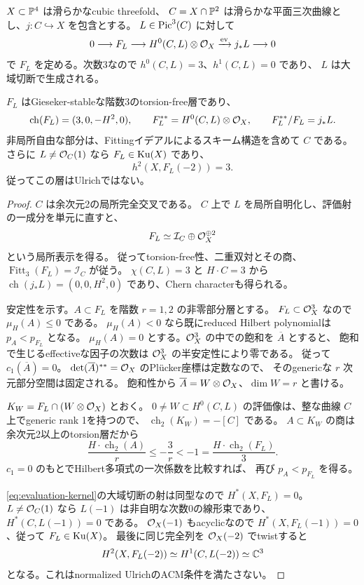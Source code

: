 $X\subset\mathbb P^4$ は滑らかなcubic threefold、
$C=X\cap\mathbb P^2$ は滑らかな平面三次曲線とし、$j:C\hookrightarrow X$ を包含とする。
$L\in\operatorname{Pic}^3(C)$ に対して
\begin{equation}\label{eq:evaluation-kernel}
 0\longrightarrow F_L\longrightarrow H^0(C,L)\otimes\mathcal O_X
 \xrightarrow{\mathrm{ev}}j_*L\longrightarrow0
\end{equation}
で $F_L$ を定める。次数3なので $h^0(C,L)=3$、$h^1(C,L)=0$ であり、
$L$ は大域切断で生成される。

\begin{theorem}[評価核の安定性と特異部分]\label{thm:evaluation-sheaf}
$F_L$ はGieseker-stableな階数3のtorsion-free層であり、
\[
 \operatorname{ch}(F_L)=(3,0,-H^2,0),\qquad
 F_L^{**}=H^0(C,L)\otimes\mathcal O_X,\qquad F_L^{**}/F_L=j_*L.
\]
非局所自由な部分は、Fittingイデアルによるスキーム構造を含めて $C$ である。
さらに $L\ne\mathcal O_C(1)$ なら $F_L\in\operatorname{Ku}(X)$ であり、
\[
 h^2(X,F_L(-2))=3.
\]
従ってこの層はUlrichではない。
\end{theorem}

\begin{proof}
$C$ は余次元2の局所完全交叉である。
$C$ 上で $L$ を局所自明化し、評価射の一成分を単元に直すと、
\[
 F_L\simeq\mathcal I_C\oplus\mathcal O_X^{\oplus2}
\]
という局所表示を得る。
従ってtorsion-free性、二重双対とその商、
$\operatorname{Fitt}_3(F_L)=\mathcal I_C$ が従う。
$\chi(C,L)=3$ と $H\cdot C=3$ から
$\operatorname{ch}(j_*L)=(0,0,H^2,0)$ であり、Chern characterも得られる。

安定性を示す。$A\subset F_L$ を階数 $r=1,2$ の非零部分層とする。
$F_L\subset\mathcal O_X^3$ なので $\mu_H(A)\le0$ である。
$\mu_H(A)<0$ なら既にreduced Hilbert polynomialは $p_A<p_{F_L}$ となる。
$\mu_H(A)=0$ とする。$\mathcal O_X^3$ の中での飽和を $\overline A$ とすると、
飽和で生じるeffectiveな因子の次数は $\mathcal O_X^3$ の半安定性により零である。
従って $c_1(\overline A)=0$。
$\det(\overline A)^{**}=\mathcal O_X$ のPl\"ucker座標は定数なので、
そのgenericな $r$ 次元部分空間は固定される。
飽和性から $\overline A=W\otimes\mathcal O_X$、$\dim W=r$ と書ける。

$K_W=F_L\cap(W\otimes\mathcal O_X)$ とおく。
$0\ne W\subset H^0(C,L)$ の評価像は、整な曲線 $C$ 上でgeneric rank 1を持つので、
$\operatorname{ch}_2(K_W)=-[C]$ である。
$A\subset K_W$ の商は余次元2以上のtorsion層だから
\[
 \frac{H\cdot\operatorname{ch}_2(A)}r
 \le-\frac3r<-1
 =\frac{H\cdot\operatorname{ch}_2(F_L)}3.
\]
$c_1=0$ のもとでHilbert多項式の一次係数を比較すれば、
再び $p_A<p_{F_L}$ を得る。

\eqref{eq:evaluation-kernel}の大域切断の射は同型なので $H^*(X,F_L)=0$。
$L\ne\mathcal O_C(1)$ なら $L(-1)$ は非自明な次数0の線形束であり、
$H^*(C,L(-1))=0$ である。
$\mathcal O_X(-1)$ もacyclicなので $H^*(X,F_L(-1))=0$、従って $F_L\in\operatorname{Ku}(X)$。
最後に同じ完全列を $\mathcal O_X(-2)$ でtwistすると
\[
 H^2(X,F_L(-2))\simeq H^1(C,L(-2))\simeq\mathbb C^3
\]
となる。これはnormalized UlrichのACM条件\cite[Section 6]{FP}を満たさない。
\end{proof}

